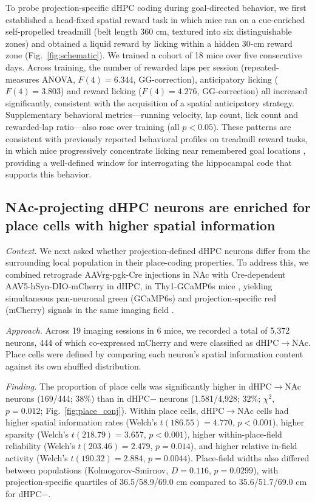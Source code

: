 \documentclass[11pt]{article}
\begin{document}
To probe projection-specific dHPC coding during goal-directed behavior, we first established a head-fixed spatial reward task in which mice ran on a cue-enriched self-propelled treadmill (belt length 360 cm, textured into six distinguishable zones) and obtained a liquid reward by licking within a hidden 30-cm reward zone (Fig.~\ref{fig:schematic}). We trained a cohort of 18 mice over five consecutive days. Across training, the number of rewarded laps per session (repeated-measures ANOVA, $F(4)=6.344$, GG-correction), anticipatory licking ($F(4)=3.803$) and reward licking ($F(4)=4.276$, GG-correction) all increased significantly, consistent with the acquisition of a spatial anticipatory strategy. Supplementary behavioral metrics---running velocity, lap count, lick count and rewarded-lap ratio---also rose over training (all $p<0.05$). These patterns are consistent with previously reported behavioral profiles on treadmill reward tasks, in which mice progressively concentrate licking near remembered goal locations \citep{Hok2007Goal,Mamad2017PlaceField}, providing a well-defined window for interrogating the hippocampal code that supports this behavior.

\subsection{NAc-projecting dHPC neurons are enriched for place cells with higher spatial information}

\textit{Context.} We next asked whether projection-defined dHPC neurons differ from the surrounding local population in their place-coding properties. To address this, we combined retrograde AAVrg-pgk-Cre injections in NAc \citep{Tervo2016AAVretro} with Cre-dependent AAV5-hSyn-DIO-mCherry in dHPC, in Thy1-GCaMP6s mice \citep{Dana2014Thy1GCaMP6,Chen2013GCaMP6}, yielding simultaneous pan-neuronal green (GCaMP6s) and projection-specific red (mCherry) signals in the same imaging field \citep{Pnevmatikakis2017NoRMCorre,Giovannucci2019CaImAn}.

\textit{Approach.} Across 19 imaging sessions in 6 mice, we recorded a total of 5{,}372 neurons, 444 of which co-expressed mCherry and were classified as dHPC$\rightarrow$NAc. Place cells were defined by comparing each neuron's spatial information content against its own shuffled distribution.

\textit{Finding.} The proportion of place cells was significantly higher in dHPC$\rightarrow$NAc neurons (169/444; 38\%) than in dHPC$-$ neurons (1{,}581/4{,}928; 32\%; $\chi^2$, $p=0.012$; Fig.~\ref{fig:place_conj}). Within place cells, dHPC$\rightarrow$NAc cells had higher spatial information rates (Welch's $t(186.55)=4.770$, $p<0.001$), higher sparsity (Welch's $t(218.79)=3.657$, $p<0.001$), higher within-place-field reliability (Welch's $t(203.46)=2.479$, $p=0.014$), and higher relative in-field activity (Welch's $t(190.32)=2.884$, $p=0.0044$). Place-field widths also differed between populations (Kolmogorov-Smirnov, $D=0.116$, $p=0.0299$), with projection-specific quartiles of 36.5/58.9/69.0 cm compared to 35.6/51.7/69.0 cm for dHPC$-$.
\end{document}
